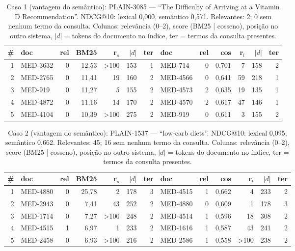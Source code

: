 \begin{table}[!htb]
\centering
\caption{Caso 1 (vantagem do semântico): PLAIN-3085 --- ``The Difficulty of Arriving at a Vitamin D Recommendation''. NDCG@10: lexical 0,000, semântico 0,571. Relevantes: 2; 0 sem nenhum termo da consulta. Colunas: relevância (0--2), score (BM25 | cosseno), posição no outro sistema, $|d|$ = tokens do documento no índice, ter = termos da consulta presentes.}
\label{tab:case1}
\scriptsize
\begin{tabular}{rlrrrrr|lrrrrr}
\toprule
\# & doc & rel & BM25 & r$_s$ & $|d|$ & ter & doc & rel & cos & r$_l$ & $|d|$ & ter \\
\midrule
1 & MED-3632 & 0 & 12,53 & >100 & 153 & 1 & MED-714 & 0 & 0,701 & 7 & 158 & 2 \\
2 & MED-2765 & 0 & 11,41 & 19 & 160 & 2 & MED-4566 & 0 & 0,641 & 59 & 218 & 1 \\
3 & MED-919 & 0 & 11,27 & 5 & 155 & 2 & MED-4573 & 2 & 0,635 & 19 & 135 & 1 \\
4 & MED-4872 & 0 & 11,16 & 14 & 170 & 2 & MED-4570 & 2 & 0,617 & 47 & 146 & 1 \\
5 & MED-4104 & 0 & 10,39 & >100 & 275 & 2 & MED-919 & 0 & 0,611 & 3 & 155 & 2 \\
\bottomrule
\end{tabular}
\end{table}
\begin{table}[!htb]
\centering
\caption{Caso 2 (vantagem do semântico): PLAIN-1537 --- ``low-carb diets''. NDCG@10: lexical 0,095, semântico 0,662. Relevantes: 45; 16 sem nenhum termo da consulta. Colunas: relevância (0--2), score (BM25 | cosseno), posição no outro sistema, $|d|$ = tokens do documento no índice, ter = termos da consulta presentes.}
\label{tab:case2}
\scriptsize
\begin{tabular}{rlrrrrr|lrrrrr}
\toprule
\# & doc & rel & BM25 & r$_s$ & $|d|$ & ter & doc & rel & cos & r$_l$ & $|d|$ & ter \\
\midrule
1 & MED-4880 & 0 & 25,78 & 2 & 178 & 3 & MED-4515 & 1 & 0,662 & 4 & 233 & 2 \\
2 & MED-2943 & 0 & 7,41 & 43 & 252 & 2 & MED-4880 & 0 & 0,609 & 1 & 178 & 3 \\
3 & MED-1714 & 0 & 7,27 & >100 & 248 & 2 & MED-4514 & 1 & 0,596 & 18 & 308 & 2 \\
4 & MED-4515 & 1 & 6,97 & 1 & 233 & 2 & MED-1616 & 1 & 0,587 & 43 & 241 & 2 \\
5 & MED-2458 & 0 & 6,93 & >100 & 216 & 2 & MED-2586 & 1 & 0,558 & >100 & 238 & 2 \\
\bottomrule
\end{tabular}
\end{table}
